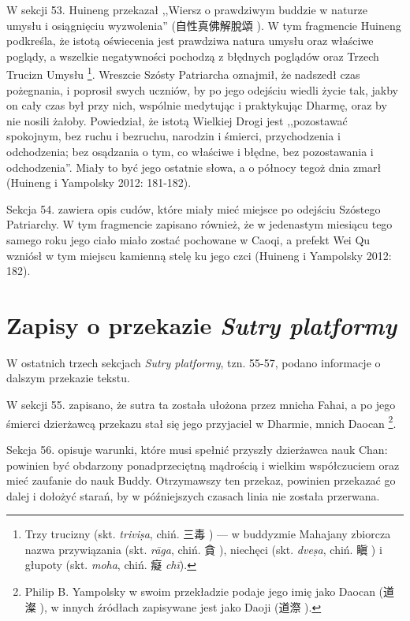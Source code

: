 W sekcji 53. Huineng przekazał ,,Wiersz o prawdziwym buddzie w naturze umysłu i osiągnięciu wyzwolenia'' (自性真佛解脫頌 ).
W tym fragmencie Huineng podkreśla, że istotą oświecenia jest prawdziwa natura umysłu oraz właściwe poglądy, a wszelkie negatywności pochodzą z błędnych poglądów oraz Trzech Trucizn Umysłu%
\footnote{Trzy trucizny\label{SanDu} (skt. \textit{trivi\d{s}a}, chiń. 三毒 ) --- w buddyzmie Mahajany zbiorcza nazwa przywiązania (skt. \textit{rāga}, chiń. 貪 ), niechęci (skt. \textit{dve\d{s}a}, chiń. 瞋 ) i głupoty (skt. \textit{moha}, chiń. 癡 \textit{chī}).}.
Wreszcie Szósty Patriarcha oznajmił, że nadszedł czas pożegnania, i poprosił swych uczniów, by po jego odejściu wiedli życie tak, jakby on cały czas był przy nich, wspólnie medytując i praktykując Dharmę, oraz by nie nosili żałoby.
Powiedział, że istotą Wielkiej Drogi jest ,,pozostawać spokojnym, bez ruchu i bezruchu, narodzin i śmierci, przychodzenia i odchodzenia; bez osądzania o tym, co właściwe i błędne, bez pozostawania i odchodzenia''.
Miały to być jego ostatnie słowa, a o północy tegoż dnia zmarł
(Huineng i Yampolsky 2012: 181-182).

Sekcja 54. zawiera opis cudów, które miały mieć miejsce po odejściu Szóstego Patriarchy.
W tym fragmencie zapisano również, że w jedenastym miesiącu tego samego roku jego ciało miało zostać pochowane w Caoqi, a prefekt Wei Qu wzniósł w tym miejscu kamienną stelę ku jego czci
(Huineng i Yampolsky 2012: 182).

\section{Zapisy o przekazie \textit{Sutry platformy}}
W ostatnich trzech sekcjach \textit{Sutry platformy}, tzn. 55-57, podano informacje o dalszym przekazie tekstu.

W sekcji 55. zapisano, że sutra ta została ułożona przez mnicha Fahai, a po jego śmierci dzierżawcą przekazu stał się jego przyjaciel w Dharmie, mnich Daocan%
\footnote{Philip B. Yampolsky w swoim przekładzie podaje jego imię jako Daocan (道澯 ), w innych źródłach zapisywane jest jako Daoji (道漈 ).}.

Sekcja 56. opisuje warunki, które musi spełnić przyszły dzierżawca nauk Chan: powinien być obdarzony ponadprzeciętną mądrością i wielkim współczuciem oraz mieć zaufanie do nauk Buddy.
Otrzymawszy ten przekaz, powinien przekazać go dalej i dołożyć starań, by w późniejszych czasach linia nie została przerwana.

